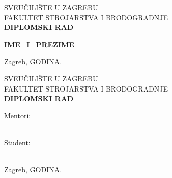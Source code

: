 \documentclass[12pt,a4paper]{article}
\begin{document}
\begin{titlepage}
    \thispagestyle{empty}
    \centering
    {\fontsize{16pt}{19pt}\selectfont SVEUČILIŠTE U ZAGREBU\\}
    {\fontsize{16pt}{19pt}\selectfont FAKULTET STROJARSTVA I BRODOGRADNJE\\}
    \vfill
    {\fontsize{28pt}{34pt}\selectfont\bfseries DIPLOMSKI RAD\\}
    \vfill
    \begin{flushright}
        {\fontsize{14pt}{17pt}\selectfont\bfseries {{IME_I_PREZIME}}\\}
    \end{flushright}
    \vspace{1cm}
    {\fontsize{14pt}{17pt}\selectfont Zagreb, {{GODINA}}.}
\end{titlepage}

\begin{titlepage}
    \thispagestyle{empty}
    \centering
    {\fontsize{16pt}{19pt}\selectfont SVEUČILIŠTE U ZAGREBU\\}
    {\fontsize{16pt}{19pt}\selectfont FAKULTET STROJARSTVA I BRODOGRADNJE\\}
    \vfill
    {\fontsize{28pt}{34pt}\selectfont\bfseries DIPLOMSKI RAD\\}
    \vfill
    \noindent
    \begin{minipage}[t]{0.48\textwidth}
        \raggedright
        {\fontsize{14pt}{17pt}\selectfont Mentori:\\}
        {\fontsize{14pt}{17pt}\\}
    \end{minipage}
    \hfill
    \begin{minipage}[t]{0.48\textwidth}
        \raggedleft
        {\fontsize{14pt}{17pt}\selectfont Student:\\}
        {\fontsize{14pt}{17pt}\\}
    \end{minipage}
    \vspace{1cm}
    \begin{center}
        {\fontsize{14pt}{17pt}\selectfont Zagreb, {{GODINA}}.}
    \end{center}
\end{titlepage}
\end{document}
